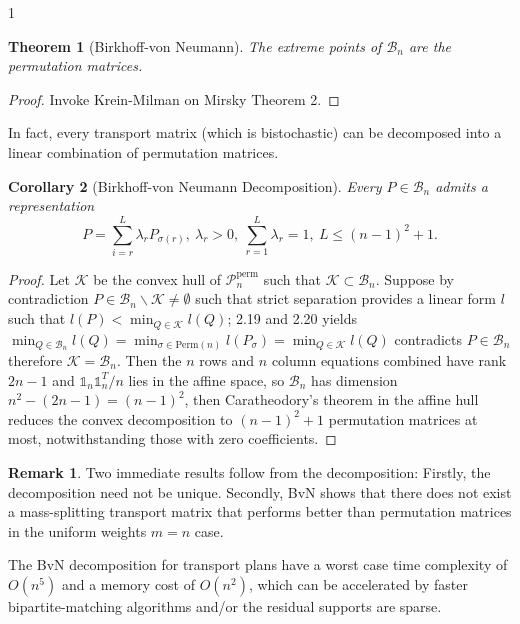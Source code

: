\documentclass[12pt]{article}
\newtheorem{theorem}{Theorem}[section]
\newtheorem{corollary}[theorem]{Corollary}
\theoremstyle{definition}
\newtheorem*{remark}{Remark}
\theoremstyle{plain}
\begin{document}
\begin{spacing}{1}
{\begin{theorem}[Birkhoff-von Neumann]
    The extreme points of $\mathcal{B}_n$ are the permutation matrices.
\end{theorem}

\begin{proof}
    Invoke Krein-Milman on Mirsky \cite{bvn} Theorem 2. 
\end{proof}

In fact, every transport matrix (which is bistochastic) can be decomposed into a linear combination of permutation matrices.

\begin{corollary}[Birkhoff-von Neumann Decomposition]
    Every $P \in \mathcal{B}_n$ admits a representation
    \[
    P = \sum_{i = r}^L \lambda_r P_{\sigma(r)}, \ \lambda_r > 0, \ \sum_{r = 1}^L \lambda_r = 1, \ L \leq (n - 1)^2 + 1.
    \]
\end{corollary}

\begin{proof}
    Let $\mathcal{K}$ be the convex hull of $\mathcal{P}_n^{\text{perm}}$ such that $\mathcal{K} \subset \mathcal{B}_n$. Suppose by contradiction $P \in \mathcal{B}_n \backslash \mathcal{K} \neq \emptyset$ such that strict separation provides a linear form $l$ such that $l(P) < \min_{Q \in \mathcal{K}} l(Q)$; 2.19 and 2.20 yields $\min_{Q \in \mathcal{B}_n} l(Q) = \min_{\sigma \in \text{Perm}(n)} l(P_\sigma) = \min_{Q \in \mathcal{K}} l(Q)$ contradicts $P \in \mathcal{B}_n$ therefore $\mathcal{K} = \mathcal{B}_n$.
    \newline
    \newline
    Then the $n$ rows and $n$ column equations combined have rank $2n - 1$ and $\mathds{1}_n \mathds{1}_n^T / n$ lies in the affine space, so $\mathcal{B}_n$ has dimension $n^2 - (2n - 1) = (n - 1)^2$, then Caratheodory's theorem in the affine hull reduces the convex decomposition to $(n - 1)^2 + 1$ permutation matrices at most, notwithstanding those with zero coefficients. 
\end{proof}

\begin{remark}
    Two immediate results follow from the decomposition: Firstly, the decomposition need not be unique. Secondly, BvN shows that there does not exist a mass-splitting transport matrix that performs better than permutation matrices in the uniform weights $m = n$ case.
\end{remark}

The BvN decomposition for transport plans have a worst case time complexity of $O(n^5)$ and a memory cost of $O(n^2)$, which can be accelerated by faster bipartite-matching algorithms and/or the residual supports are sparse. 

}
\end{spacing}
\end{document}

